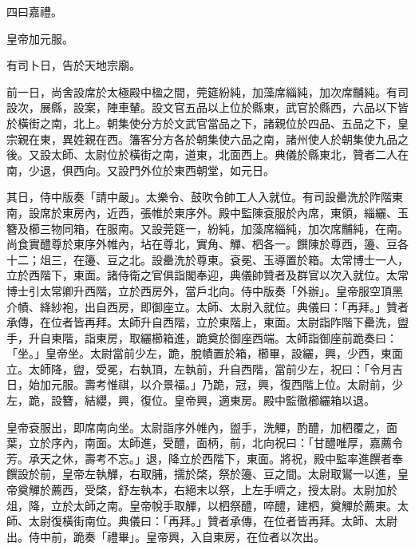 
\begin{pinyinscope}

 四曰嘉禮。



 皇帝加元服。



 有司卜日，告於天地宗廟。



 前一日，尚舍設席於太極殿中楹之間，莞筵紛純，加藻席緇純，加次席黼純。有司設次，展縣，設案，陣車輦。設文官五品以上位於縣東，武官於縣西，六品以下皆於橫街之南，北上。朝集使分方於文武官當品之下，諸親位於四品、五品之下，皇宗親在東，異姓親在西。籓客分方各於朝集使六品之南，諸州使人於朝集使九品之後。又設太師、太尉位於橫街之南，道東，北面西上。典儀於縣東北，贊者二人在南，少退，俱西向。又設門外位於東西朝堂，如元日。



 其日，侍中版奏「請中嚴」。太樂令、鼓吹令帥工人入就位。有司設罍洗於阼階東南，設席於東房內，近西，張帷於東序外。殿中監陳袞服於內席，東領，緇纚、玉簪及櫛三物同箱，在服南。又設莞筵一，紛純，加藻席緇純，加次席黼純，在南。尚食實醴尊於東序外帷內，坫在尊北，實角、觶、柶各一。饌陳於尊西，籩、豆各十二；俎三，在籩、豆之北。設罍洗於尊東。袞冕、玉導置於箱。太常博士一人，立於西階下，東面。諸侍衛之官俱詣閣奉迎，典儀帥贊者及群官以次入就位。太常博士引太常卿升西階，立於西房外，當戶北向。侍中版奏「外辦」。皇帝服空頂黑介幘、絳紗袍，出自西房，即御座立。太師、太尉入就位。典儀曰：「再拜。」贊者承傳，在位者皆再拜。太師升自西階，立於東階上，東面。太尉詣阼階下罍洗，盥手，升自東階，詣東房，取纚櫛箱進，跪奠於御座西端。太師詣御座前跪奏曰：「坐。」皇帝坐。太尉當前少左，跪，脫幘置於箱，櫛畢，設纚，興，少西，東面立。太師降，盥，受冕，右執頂，左執前，升自西階，當前少左，祝曰：「令月吉日，始加元服。壽考惟祺，以介景福。」乃跪，冠，興，復西階上位。太尉前，少左，跪，設簪，結纓，興，復位。皇帝興，適東房。殿中監徹櫛纚箱以退。



 皇帝袞服出，即席南向坐。太尉詣序外帷內，盥手，洗觶，酌醴，加柶覆之，面葉，立於序內，南面。太師進，受醴，面柄，前，北向祝曰：「甘醴唯厚，嘉薦令芳。承天之休，壽考不忘。」退，降立於西階下，東面。將祝，殿中監率進饌者奉饌設於前，皇帝左執觶，右取脯，擩於棨，祭於籩、豆之間。太尉取鸑一以進，皇帝奠觶於薦西，受棨，舒左執本，右絕末以祭，上左手嚌之，授太尉。太尉加於俎，降，立於太師之南。皇帝帨手取觶，以柶祭醴，啐醴，建柶，奠觶於薦東。太師、太尉復橫街南位。典儀曰：「再拜。」贊者承傳，在位者皆再拜。太師、太尉出。侍中前，跪奏「禮畢」。皇帝興，入自東房，在位者以次出。




\end{pinyinscope}
